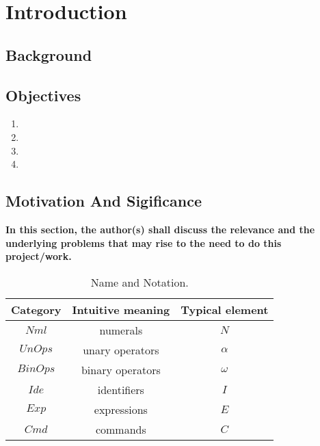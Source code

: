 




\chapter{Introduction}

\section{{\bf{Background}}}








\section{{\bf{Objectives}}}
{\bf\color{black}
\begin{enumerate}
 \item
 \item 
 \item 
 \item 
\end{enumerate}
}

\section{\bf Motivation And Sigificance}
{\bf\color{red}In this section, the author(s) shall discuss the relevance and the underlying problems that may rise to the need to do this project/work.}
\begin{table}[htpb]
\caption{Name and Notation.}
\begin{center}
\begin{tabular}{|c|c|c|}\hline
Category & Intuitive meaning & Typical element \\ \hline
                                                    \hline
$\mathit{Nml}$ & numerals & $N$ \\ \hline
$\mathit{UnOps}$ & unary operators & $\alpha$ \\ \hline
$\mathit{BinOps}$ & binary operators & $\omega$ \\ \hline
$\mathit{Ide}$ & identifiers & $I$ \\ \hline
$\mathit{Exp}$ & expressions & $E$ \\ \hline
$\mathit{Cmd}$ & commands & $C$ \\ \hline
\end{tabular}
\end{center}
\end{table}


